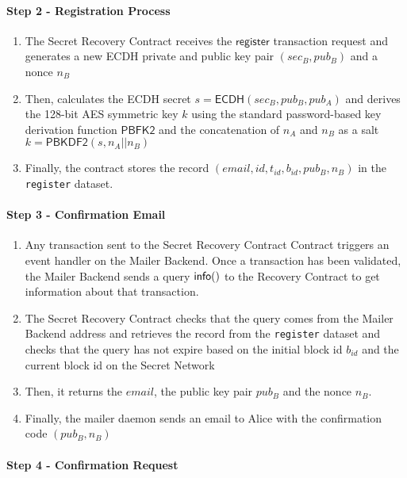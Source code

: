 \documentclass[12pt]{article}
\newcommand{\ms}[1]{\ensuremath{\mathsf{#1}}}
\newcommand{\qry}[3]{\ms{#1}(#3)}
\begin{document}
\begin{enumerate}
\paragraph{Step 2 - Registration Process}

\begin{enumerate}[label=2.\arabic*]
  \item The Secret Recovery Contract receives the $\ms{register}$ transaction request and generates a new ECDH private and public key pair $(sec_B, pub_B)$ and a nonce $n_B$
  \item Then, calculates the ECDH secret $s=\ms{ECDH}(sec_B, pub_B, pub_A)$ and derives the 128-bit AES symmetric key $k$ using the standard password-based key derivation function $\ms{PBFK2}$ and the concatenation of $n_A$ and $n_B$ as a salt $k=\ms{PBKDF2}(s, n_A || n_B)$
  \item Finally, the contract stores the record $(email, id, t_{id}, b_{id}, pub_B, n_B)$ in the {\tt register} dataset. 
\end{enumerate}

\paragraph{Step 3 - Confirmation Email}

\begin{enumerate}[label=3.\arabic*]
  \item Any transaction sent to the Secret Recovery Contract Contract triggers an event handler on the Mailer Backend. Once a transaction has been validated, the Mailer Backend sends a query $\qry{info}{t_id}$ to the Recovery Contract to get information about that transaction.
  \item The Secret Recovery Contract checks that the query comes from the Mailer Backend address and retrieves the record from the {\tt register} dataset and checks that the query has not expire based on the initial block id $b_{id}$ and the current block id on the Secret Network
  \item Then, it returns the $email$, the public key pair $pub_B$ and the nonce $n_B$.
  \item Finally, the mailer daemon sends an email to Alice with the confirmation code $(pub_B, n_B)$
\end{enumerate}

\paragraph{Step 4 - Confirmation Request}


\end{enumerate}
\end{document}
